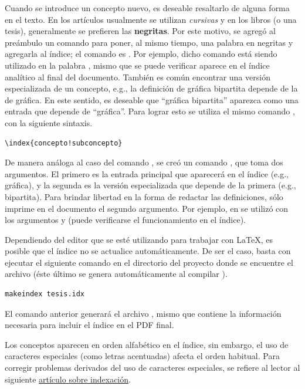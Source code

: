 Cuando se introduce un concepto nuevo, es deseable resaltarlo de alguna forma en
el texto.   En los art\'iculos usualmente se utilizan \textit{cursivas} y en los
libros (o una tesis), generalmente se prefieren las \textbf{negritas}.   Por
este motivo, se agreg\'o al pre\'ambulo un comando para poner, al mismo tiempo,
una palabra en negritas y agregarla al \'indice; el comando es
.   Por ejemplo, dicho comando est\'a siendo
utilizado en la palabra , mismo que se puede verificar aparece
en el \'indice anal\'itico al final del documento. Tambi\'en es com\'un
encontrar una versi\'on especializada de un concepto, e.g., la definici\'on de
gr\'afica bipartita depende de la de gr\'afica.   En este sentido, es deseable
que ``gr\'afica bipartita'' aparezca como una entrada que depende de
``gr\'afica''.   Para lograr esto se utiliza el mismo comando
, con la siguiente sintaxis.
\begin{lstlisting}
\index{concepto!subconcepto}
\end{lstlisting}

De manera an\'aloga al caso del comando , se cre\'o
un comando , que toma dos argumentos.  El primero
es la entrada principal que aparecer\'a en el \'indice (e.g., gr\'afica), y la
segunda es la versi\'on especializada que depende de la primera (e.g.,
bipartita).   Para brindar libertad en la forma de redactar las definiciones,
 s\'olo imprime en el documento el segundo
argumento.   Por ejemplo, en  se utiliz\'o
 con los argumentos  y
 (puede verificarse el funcionamiento en el \'indice).

Dependiendo del editor que se est\'e utilizando para trabajar con \LaTeX, es
posible que el \'indice no se actualice autom\'aticamente.   De ser el caso,
basta con ejecutar el siguiente comando en el directorio del proyecto donde se
encuentre el archivo  (\'este \'ultimo se genera
autom\'aticamente al compilar ).
\lstset{language=bash}
\begin{lstlisting}
makeindex tesis.idx
\end{lstlisting}

El comando anterior generar\'a el archivo , mismo que contiene la
informaci\'on necesaria para incluir el \'indice en el PDF final.

Los conceptos aparecen en orden alfab\'etico en el \'indice, sin embargo, el uso
de caracteres especiales (como letras acentuadas) afecta el orden habitual. Para
corregir problemas derivados del uso de caracteres especiales, se refiere al
lector al siguiente \href{https://en.wikibooks.org/wiki/LaTeX/%
Indexing#Using_special_characters}{art\'iculo sobre indexaci\'on}.
